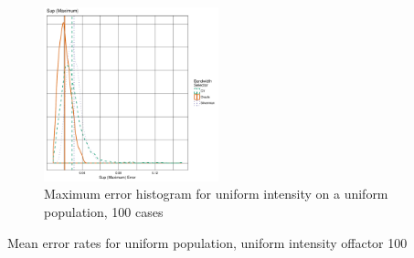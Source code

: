 \begin{figure}[htbp]
    \centering
    \includegraphics[width=0.45\textwidth]{output/maxerr-histogram}
    \caption[Maximum error: uniform on uniform]{Maximum error histogram for uniform intensity on a uniform population, 100 cases}
    \label{fig:maxerr:template}
\end{figure}

\begin{table}[htbp]
\centering

\caption{Mean error rates for uniform population, uniform intensity of\gls{factor} 100}
\label{tab:errors:template}
\end{table}

